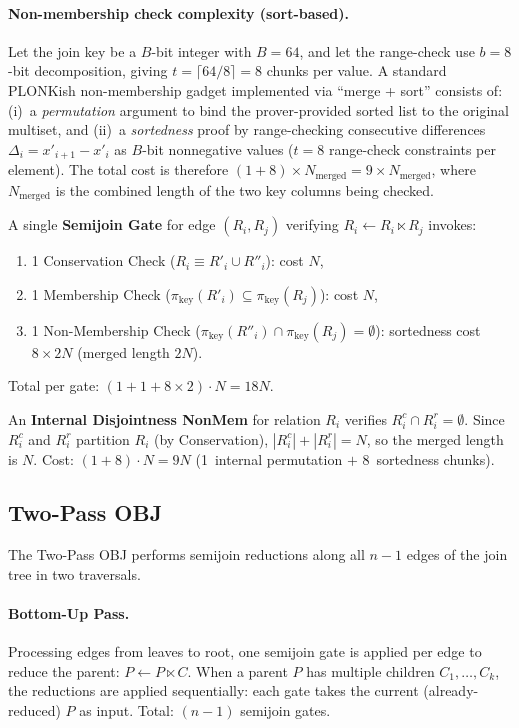 \documentclass[sigconf]{acmart}
\renewcommand{\emph}[1]{\textit{#1}}
\begin{document}
\paragraph{Non-membership check complexity (sort-based).}
Let the join key be a $B$-bit integer with $B=64$, and let the range-check use $b=8$-bit
decomposition, giving $t = \lceil 64/8 \rceil = 8$ chunks per value.
A standard PLONKish non-membership gadget implemented via ``merge + sort'' consists of:
(i)~a \emph{permutation} argument to bind the prover-provided sorted list to the original
multiset, and
(ii)~a \emph{sortedness} proof by range-checking consecutive differences
$\Delta_i = x'_{i+1} - x'_i$ as $B$-bit nonnegative values ($t = 8$ range-check constraints per element).
The total cost is therefore $(1 + 8) \times N_{\text{merged}} = 9 \times N_{\text{merged}}$, where $N_{\text{merged}}$ is the combined length of the two key columns being checked.

\noindent A single \textbf{Semijoin Gate} for edge $(R_i, R_j)$ verifying $R_i \leftarrow R_i \ltimes R_j$ invokes:
\begin{enumerate}
    \item 1 Conservation Check ($R_i \equiv R'_i \cup R''_i$): cost $N$,
    \item 1 Membership Check ($\pi_{\text{key}}(R'_i) \subseteq \pi_{\text{key}}(R_j)$): cost $N$,
    \item 1 Non-Membership Check ($\pi_{\text{key}}(R''_i) \cap \pi_{\text{key}}(R_j) = \emptyset$): sortedness cost $8 \times 2N$ (merged length $2N$).
\end{enumerate}
Total per gate: $(1 + 1 + 8 \times 2) \cdot N = 18N$.

\noindent An \textbf{Internal Disjointness NonMem} for relation $R_i$ verifies $R_i^c \cap R_i^r = \emptyset$.
Since $R_i^c$ and $R_i^r$ partition $R_i$ (by Conservation), $|R_i^c| + |R_i^r| = N$, so the merged length is $N$.
Cost: $(1 + 8) \cdot N = 9N$ (1~internal permutation $+$ 8~sortedness chunks).

\subsection{Two-Pass OBJ}

The Two-Pass OBJ performs semijoin reductions along all $n-1$ edges of the join tree in two traversals.

\paragraph{Bottom-Up Pass.}
Processing edges from leaves to root, one semijoin gate is applied per edge to reduce the parent: $P \leftarrow P \ltimes C$.
When a parent $P$ has multiple children $C_1, \dots, C_k$, the reductions are applied sequentially: each gate takes the current (already-reduced) $P$ as input.
Total: $(n-1)$ semijoin gates.
\end{document}
